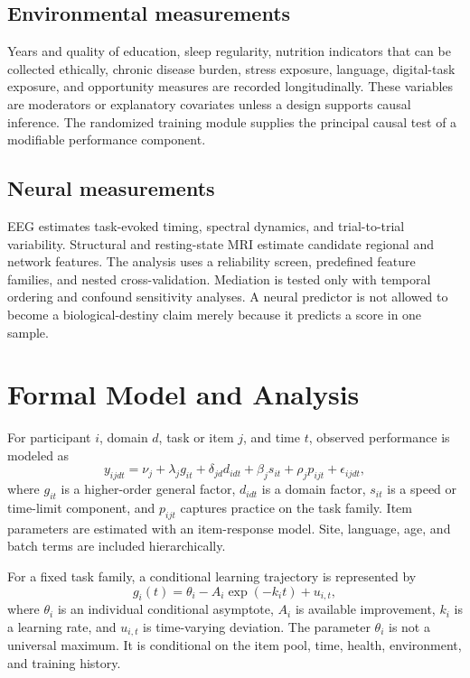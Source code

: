 \documentclass[conference]{IEEEtran}
\begin{document}
\subsection{Environmental measurements}
Years and quality of education, sleep regularity, nutrition indicators that can be collected ethically, chronic disease burden, stress exposure, language, digital-task exposure, and opportunity measures are recorded longitudinally. These variables are moderators or explanatory covariates unless a design supports causal inference. The randomized training module supplies the principal causal test of a modifiable performance component.

\subsection{Neural measurements}
EEG estimates task-evoked timing, spectral dynamics, and trial-to-trial variability. Structural and resting-state MRI estimate candidate regional and network features. The analysis uses a reliability screen, predefined feature families, and nested cross-validation. Mediation is tested only with temporal ordering and confound sensitivity analyses. A neural predictor is not allowed to become a biological-destiny claim merely because it predicts a score in one sample.

\section{Formal Model and Analysis}
\label{sec:model}
For participant $i$, domain $d$, task or item $j$, and time $t$, observed performance is modeled as
\begin{equation}
y_{ijdt}=\nu_j+\lambda_j g_{it}+\delta_{jd}d_{idt}+\beta_j s_{it}+\rho_j p_{ijt}+\epsilon_{ijdt},
\label{eq:factor}
\end{equation}
where $g_{it}$ is a higher-order general factor, $d_{idt}$ is a domain factor, $s_{it}$ is a speed or time-limit component, and $p_{ijt}$ captures practice on the task family. Item parameters are estimated with an item-response model. Site, language, age, and batch terms are included hierarchically.

For a fixed task family, a conditional learning trajectory is represented by
\begin{equation}
g_i(t)=\theta_i-A_i\exp(-k_i t)+u_{i,t},
\label{eq:asymptote}
\end{equation}
where $\theta_i$ is an individual conditional asymptote, $A_i$ is available improvement, $k_i$ is a learning rate, and $u_{i,t}$ is time-varying deviation. The parameter $\theta_i$ is not a universal maximum. It is conditional on the item pool, time, health, environment, and training history.
\end{document}
